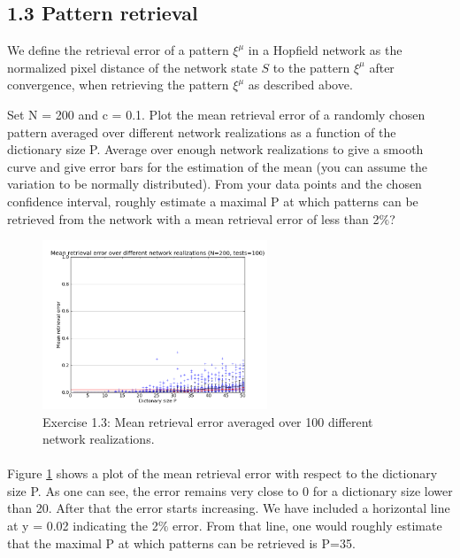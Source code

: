 \subsection{1.3 Pattern retrieval}
\small
\begin{itshape}
We define the retrieval error of a pattern $\xi^\mu$ in a Hopfield network as the normalized pixel distance of the network state $S$ to the pattern $\xi^\mu$ after convergence, when retrieving the pattern $\xi^\mu$ as described above.

Set N = 200 and c = 0.1. Plot the mean retrieval error of a randomly chosen pattern averaged over different network realizations as a function of the dictionary size P. Average over enough network realizations to give a smooth curve and give error bars for the estimation of the mean (you can assume the variation to be normally distributed). From your data points and the chosen confidence interval, roughly estimate a maximal P at which patterns can be retrieved from the network with a mean retrieval error of less than 2$\%$?
\end{itshape}

\begin{figure}
  \vspace{-20pt}
  \begin{center}
    \includegraphics[width=0.6\textwidth]{img/plots/error-avg-100.png}
  \end{center}
  \vspace{-20pt}
  \caption{Exercise 1.3: Mean retrieval error averaged over 100 different network realizations.}
  \label{fig: Question 1.3}
  \vspace{-10pt}
\end{figure}
\paragraph*{}
Figure \ref{fig: Question 1.3} shows a plot of the mean retrieval error with respect to the dictionary size P. As one can see, the error remains very close to 0 for a dictionary size lower than 20. After that the error starts increasing. We have included a horizontal line at y = 0.02 indicating the 2$\%$ error. From that line, one would roughly estimate that the maximal P at which patterns can be retrieved is P=35. 

